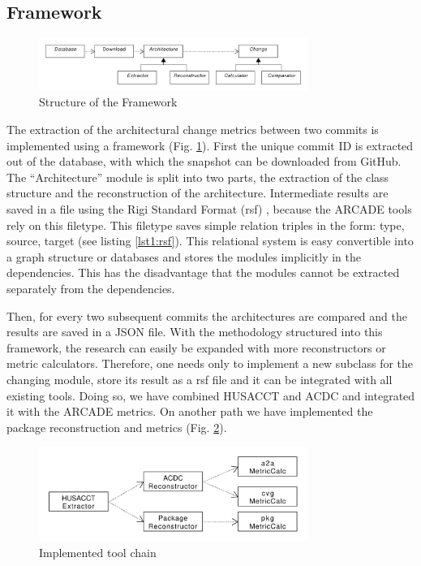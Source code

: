 \documentclass[conference]{IEEEtran}
\begin{document}
\subsection{Framework}

\begin{figure}[!t]
	\centering
	\includegraphics[width=3.45in]{assets/architecture.pdf}
	\caption{Structure of the Framework}
	\label{frameworkStructure}
\end{figure}

The extraction of the architectural change metrics between two commits is implemented using a framework (Fig. \ref{frameworkStructure}). First the unique commit ID is extracted out of the database, with which the snapshot can be downloaded from GitHub. 
The ``Architecture'' module is split into two parts, the extraction of the class structure and the reconstruction of the architecture. Intermediate results are saved in a file using the Rigi Standard Format (rsf) \cite{RSF}, because the ARCADE tools rely on this filetype. This filetype saves simple relation triples in the form: type, source, target (see listing \ref{lst1:rsf}). This relational system is easy convertible into a graph structure or databases and stores the modules implicitly in the dependencies. This has the disadvantage that the modules cannot be extracted separately from the dependencies.

Then, for every two subsequent commits the architectures are compared and the results are saved in a JSON file. With the methodology structured into this framework, the research can easily be expanded with more reconstructors or metric calculators. Therefore, one needs only to implement a new subclass for the changing module, store its result as a rsf file and it can be integrated with all existing tools. Doing so, we have combined HUSACCT and ACDC and integrated it with the ARCADE metrics. On another path we have implemented the package reconstruction and metrics (Fig. \ref{implToolchain}).

\begin{figure}[!t]
	\centering
	\includegraphics[width=3.45in]{assets/implementedArc.pdf}
	\caption{Implemented tool chain}
	\label{implToolchain}
\end{figure}
\end{document}
